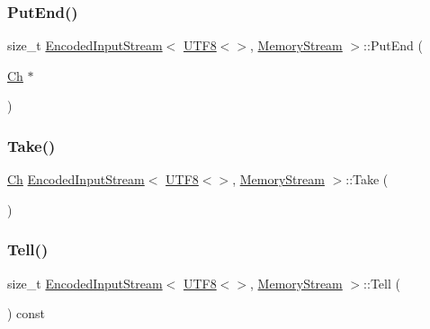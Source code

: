\subsubsection{\texorpdfstring{Put\+End()}{PutEnd()}}
{\footnotesize\ttfamily size\+\_\+t \hyperlink{classEncodedInputStream}{Encoded\+Input\+Stream}$<$ \hyperlink{structUTF8}{U\+T\+F8}$<$$>$, \hyperlink{structMemoryStream}{Memory\+Stream} $>$\+::Put\+End (\begin{DoxyParamCaption}\item[{\hyperlink{classEncodedInputStream_3_01UTF8_3_4_00_01MemoryStream_01_4_a091eb31dd2554bf10054148953f9b3bf}{Ch} $\ast$}]{ }\end{DoxyParamCaption})\hspace{0.3cm}{\ttfamily [inline]}}

\mbox{\label{classEncodedInputStream_3_01UTF8_3_4_00_01MemoryStream_01_4_a29eeabe922bb6c7cbb5c16fe8a3a7859}} 
\subsubsection{\texorpdfstring{Take()}{Take()}}
{\footnotesize\ttfamily \hyperlink{classEncodedInputStream_3_01UTF8_3_4_00_01MemoryStream_01_4_a091eb31dd2554bf10054148953f9b3bf}{Ch} \hyperlink{classEncodedInputStream}{Encoded\+Input\+Stream}$<$ \hyperlink{structUTF8}{U\+T\+F8}$<$$>$, \hyperlink{structMemoryStream}{Memory\+Stream} $>$\+::Take (\begin{DoxyParamCaption}{ }\end{DoxyParamCaption})\hspace{0.3cm}{\ttfamily [inline]}}

\mbox{\label{classEncodedInputStream_3_01UTF8_3_4_00_01MemoryStream_01_4_a34ffcddbbfd66aa4ea36ad6944ac9875}} 
\subsubsection{\texorpdfstring{Tell()}{Tell()}}
{\footnotesize\ttfamily size\+\_\+t \hyperlink{classEncodedInputStream}{Encoded\+Input\+Stream}$<$ \hyperlink{structUTF8}{U\+T\+F8}$<$$>$, \hyperlink{structMemoryStream}{Memory\+Stream} $>$\+::Tell (\begin{DoxyParamCaption}{ }\end{DoxyParamCaption}) const\hspace{0.3cm}{\ttfamily [inline]}}



